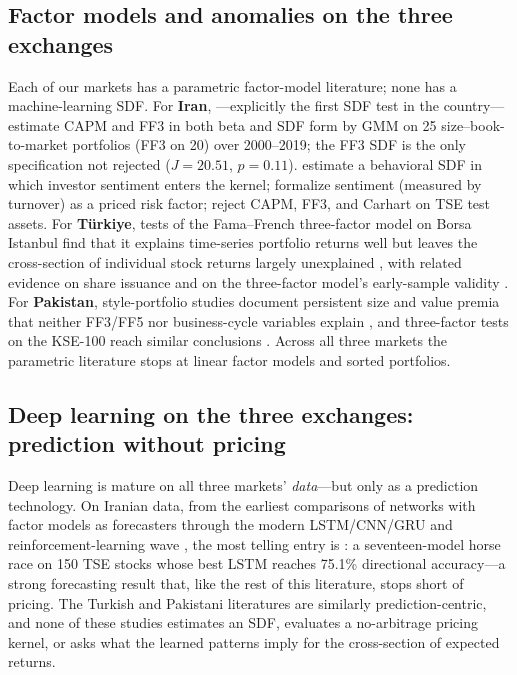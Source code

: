 \documentclass[12pt]{article}
\begin{document}
\subsection{Factor models and anomalies on the three exchanges}

Each of our markets has a parametric factor-model literature; none has a machine-learning SDF. For \textbf{Iran}, \citet{talakesh2023}---explicitly the first SDF test in the country---estimate CAPM and FF3 in both beta and SDF form by GMM on 25 size--book-to-market portfolios (FF3 on 20) over 2000--2019; the FF3 SDF is the only specification not rejected ($J=20.51$, $p=0.11$). \citet{taleblou2022} estimate a behavioral SDF in which investor sentiment enters the kernel; \citet{taleblou2024} formalize sentiment (measured by turnover) as a priced risk factor; \citet{davallou2015} reject CAPM, FF3, and Carhart on TSE test assets. For \textbf{T\"urkiye}, tests of the Fama--French three-factor model on Borsa Istanbul find that it explains time-series portfolio returns well but leaves the cross-section of individual stock returns largely unexplained \citep{cobanoglu2025}, with related evidence on share issuance \citep{atilgan2016} and on the three-factor model's early-sample validity \citep{guzeldere2012,aras2018}. For \textbf{Pakistan}, style-portfolio studies document persistent size and value premia that neither FF3/FF5 nor business-cycle variables explain \citep{kashif2023}, and three-factor tests on the KSE-100 reach similar conclusions \citep{abbas2015}. Across all three markets the parametric literature stops at linear factor models and sorted portfolios.

\subsection{Deep learning on the three exchanges: prediction without pricing}

Deep learning is mature on all three markets' \emph{data}---but only as a prediction technology. On Iranian data, from the earliest comparisons of networks with factor models as forecasters \citep{chavoshi2003,namazi2007,azar2010,esfahanipour2011} through the modern LSTM/CNN/GRU and reinforcement-learning wave \citep{nabipour2020,hadizadeh2023,tehrani2025,osoolian2025,raefi2018}, the most telling entry is \citet{heidari2022}: a seventeen-model horse race on 150 TSE stocks whose best LSTM reaches 75.1\% directional accuracy---a strong forecasting result that, like the rest of this literature, stops short of pricing. The Turkish and Pakistani literatures are similarly prediction-centric, and none of these studies estimates an SDF, evaluates a no-arbitrage pricing kernel, or asks what the learned patterns imply for the cross-section of expected returns.
\end{document}
